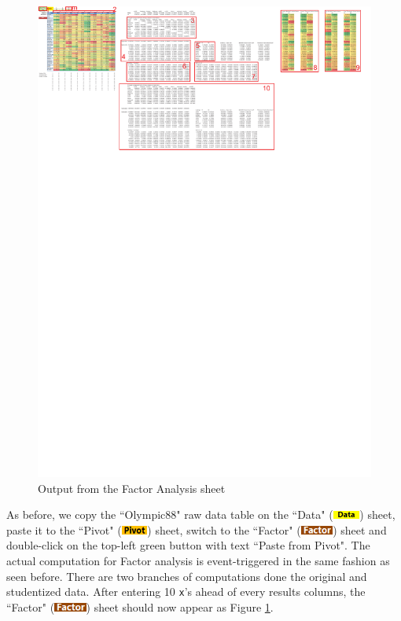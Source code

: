 \documentclass[article]{jss}
\numberwithin{equation}{subsection}
\newcommand{\shtData}{``Data" (\includegraphics[height=8pt, keepaspectratio=true]{img/DataSheetTab_png}) }
\newcommand{\shtPivot}{``Pivot" (\includegraphics[height=8pt, keepaspectratio=true]{img/PivotSheetTab_png}) }
\newcommand{\shtFactor}{``Factor" (\includegraphics[height=8pt, keepaspectratio=true]{img/FactorSheetTab_png}) }
\begin{document}
        \begin{figure}[!tbh]
                \includegraphics[width=\linewidth,keepaspectratio=true]{img/FactorSheetOutput_markup}
                \vspace{-20pt}\centering{}\protect\caption{Output from the Factor Analysis sheet}\label{fig:FactorSheetOutput_markup}
        \end{figure}
        
        As before, we copy the  ``Olympic88" raw data table on the \shtData sheet, paste it to the \shtPivot sheet, switch to the \shtFactor sheet and double-click on the top-left green button with text ``Paste from Pivot". The actual computation for Factor analysis is event-triggered in the same fashion as seen before. There are two branches of computations done the original and studentized data. After entering 10 \texttt{x}'s ahead of every results columns, the \shtFactor sheet should now appear as Figure \ref*{fig:FactorSheetOutput_markup}.
        
\end{document}
